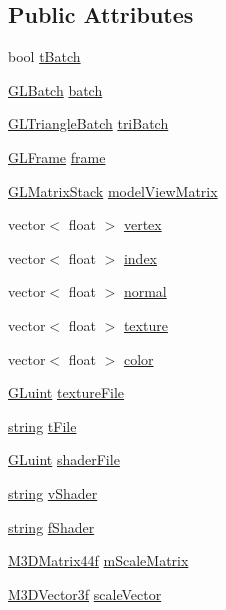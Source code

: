 \subsection*{Public Attributes}
\begin{DoxyCompactItemize}
\item 
bool \hyperlink{class_simple_object_a57b19debeebd6cc7544229593ac6f384}{t\-Batch}
\item 
\hyperlink{class_g_l_batch}{G\-L\-Batch} \hyperlink{class_simple_object_a7b91addc8702d48b2f7fc55ef477865d}{batch}
\item 
\hyperlink{class_g_l_triangle_batch}{G\-L\-Triangle\-Batch} \hyperlink{class_simple_object_a036fe05c95aabf2733dc0dab0470c385}{tri\-Batch}
\item 
\hyperlink{class_g_l_frame}{G\-L\-Frame} \hyperlink{class_simple_object_a981496140aef8731d72bec626a8151f5}{frame}
\item 
\hyperlink{class_g_l_matrix_stack}{G\-L\-Matrix\-Stack} \hyperlink{class_simple_object_ae10c997b5d538a0d2773e26473f8acd4}{model\-View\-Matrix}
\item 
vector$<$ float $>$ \hyperlink{class_simple_object_a6c506a2b642e61f7209ee9d3e455eb6a}{vertex}
\item 
vector$<$ float $>$ \hyperlink{class_simple_object_a0fce8b7b9f26a11982447cc4b8bc1907}{index}
\item 
vector$<$ float $>$ \hyperlink{class_simple_object_a87b06e177a337bb9f7655dbd5067cf7b}{normal}
\item 
vector$<$ float $>$ \hyperlink{class_simple_object_a4f989f1e7ef76020fe605947759157e1}{texture}
\item 
vector$<$ float $>$ \hyperlink{class_simple_object_a1fb6c6bd5c79d711f962d9c5e39d43ce}{color}
\item 
\hyperlink{_g_l_e_w_2glew_8h_a68c4714e43d8e827d80759f9cb864f3c}{G\-Luint} \hyperlink{class_simple_object_a5ef5676def2f0a847bd0672241f32d1c}{texture\-File}
\item 
\hyperlink{_g_l_e_w_2glew_8h_a06b88fc81ad0b30d1512e9609e3d7c82}{string} \hyperlink{class_simple_object_aab41156b3c92ca7ba616659dd174cf04}{t\-File}
\item 
\hyperlink{_g_l_e_w_2glew_8h_a68c4714e43d8e827d80759f9cb864f3c}{G\-Luint} \hyperlink{class_simple_object_aefcac4844710fb10f8cdfc537b1a7dba}{shader\-File}
\item 
\hyperlink{_g_l_e_w_2glew_8h_a06b88fc81ad0b30d1512e9609e3d7c82}{string} \hyperlink{class_simple_object_aeb8f9ac2ea5c7342f14eb8d7e6afa9bc}{v\-Shader}
\item 
\hyperlink{_g_l_e_w_2glew_8h_a06b88fc81ad0b30d1512e9609e3d7c82}{string} \hyperlink{class_simple_object_a66b038ae0b5d0801a613b39f020f8993}{f\-Shader}
\item 
\hyperlink{math3d_8h_a1e8690467d81d5ed97c5ecc3a144a4ac}{M3\-D\-Matrix44f} \hyperlink{class_simple_object_af1ab3dd3b36a2d36d8b82fffc409ff92}{m\-Scale\-Matrix}
\item 
\hyperlink{math3d_8h_a2163fe22bd4208b846d22ec7e74cf858}{M3\-D\-Vector3f} \hyperlink{class_simple_object_a776a2ba2bde4e83e206346f8a22d454f}{scale\-Vector}
\end{DoxyCompactItemize}


